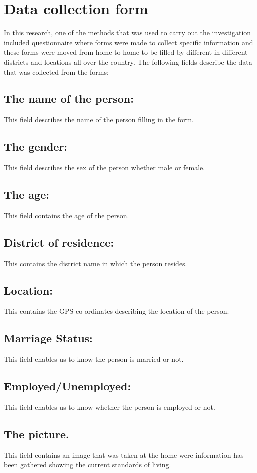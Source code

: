 \documentclass[a4paper,12pt]{article}
\begin{document}
\section{Data collection form}
In this research, one of the methods that was used to carry out the investigation included questionnaire where forms were made to collect specific information and these forms were moved from home to home to be filled by different in different districts and locations all over the country.
The following fields describe the data that was collected from the forms:
\subsection{The name of the person:}
This field describes the name of the person filling in the form.
\subsection{The gender:}
This field describes the sex of the person whether male or female.

\subsection{The age:}
This field contains the age of the person.
\subsection{District of residence:}
This contains the district name in which the person resides.
\subsection{Location:}
This contains the GPS co-ordinates describing the location of the person.
\subsection{Marriage Status:}
This field enables us to know the person is married or not.
\subsection{Employed/Unemployed:}
This field enables us to know whether the person is employed or not.
\subsection{The picture.}
This field contains an image that was taken at the home were information has been gathered showing the current standards of living.
\end{document}
